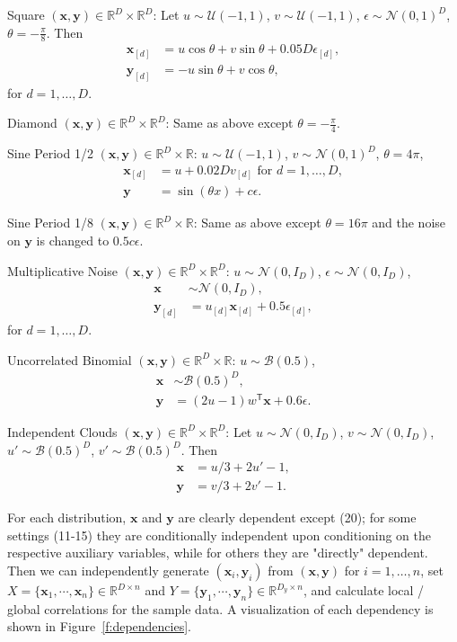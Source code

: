 \documentclass[11pt]{article}
\providecommand{\mb}[1]{\boldsymbol{#1}}
\providecommand{\mc}[1]{\mathcal{#1}}
\newcommand{\Real}{\mathbb{R}}
\newcommand{\T}{^{\ensuremath{\mathsf{T}}}}           %
\newcommand{\mbx}{\ensuremath{\mb{x}}}
\newcommand{\mby}{\ensuremath{\mb{y}}}
\begin{document}
\begin{compactenum}
\item Square $(\mbx,\mby) \in \Real^{D} \times \Real^{D}$: Let $u \sim \mc{U}(-1,1)$, $v \sim \mc{U}(-1,1)$, $\epsilon \sim \mc{N}(0,1)^{D}$, $\theta=-\frac{\pi}{8}$. Then
\begin{align*}
\mbx_{[d]}&=u \cos\theta + v \sin\theta + 0.05 D\epsilon_{[d]},\\
\mby_{[d]}&=-u \sin\theta + v \cos\theta,
\end{align*}
for $d=1,\ldots,D$.
\item Diamond $(\mbx,\mby) \in \Real^{D} \times \Real^{D}$: Same as above except $\theta=-\frac{\pi}{4}$.
\item Sine Period 1/2 $(\mbx,\mby) \in \Real^{D} \times \Real$: $u \sim \mc{U}(-1,1)$, $v \sim \mc{N}(0,1)^{D}$, $\theta=4\pi$,
\begin{align*}
\mbx_{[d]}&=u+0.02 D v_{[d]} \mbox{ for $d=1,\ldots,D$}, \\
\mby&=\sin ( \theta x )+c\epsilon.
\end{align*}
\item Sine Period 1/8 $(\mbx,\mby) \in \Real^{D} \times \Real$: Same as above except $\theta=16\pi$ and the noise on $\mby$ is changed to $0.5c\epsilon$.
\item Multiplicative Noise $(\mbx,\mby) \in \Real^{D} \times \Real^{D}$: $u \sim \mc{N}(0, I_{D})$, $\epsilon \sim \mc{N}(0, I_{D})$,
\begin{align*}
\mbx &\sim \mc{N}(0, I_{D}),\\
\mby_{[d]}&=u_{[d]}\mbx_{[d]}+0.5\epsilon_{[d]},
\end{align*}
for $d=1,\ldots,D$.
\item Uncorrelated Binomial $(\mbx,\mby) \in \Real^{D} \times \Real$: $u \sim \mc{B}(0.5)$,
\begin{align*}
\mbx &\sim \mc{B}(0.5)^{D},\\
\mby&=(2u-1)w\T \mbx+0.6\epsilon.
\end{align*}
\item Independent Clouds $(\mbx,\mby) \in \Real^{D} \times \Real^{D}$: Let $u \sim \mc{N}(0,I_{D})$, $v \sim \mc{N}(0,I_{D})$, $u' \sim \mc{B}(0.5)^{D}$, $v' \sim \mc{B}(0.5)^{D}$. Then
\begin{align*}
\mbx&=u/3+2u'-1,\\
\mby&=v/3+2v'-1.
\end{align*}
\end{compactenum}

For each distribution, $\mb{x}$ and $\mb{y}$ are clearly dependent except  (20); for some settings (11-15) they are conditionally independent upon conditioning on the respective auxiliary variables, while for others they are "directly" dependent. Then we can independently generate $(\mbx_{i},\mby_{i})$ from $(\mb{x},\mb{y})$ for $i=1,\ldots,n$, set $X=\{\mbx_{1},\cdots, \mbx_{n}\} \in \Real^{D \times n}$ and $Y=\{\mby_{1},\cdots, \mby_{n}\} \in \Real^{D_{y} \times n}$, and calculate local / global correlations for the sample data. A visualization of each dependency is shown in Figure~\ref{f:dependencies}.
\end{document}

